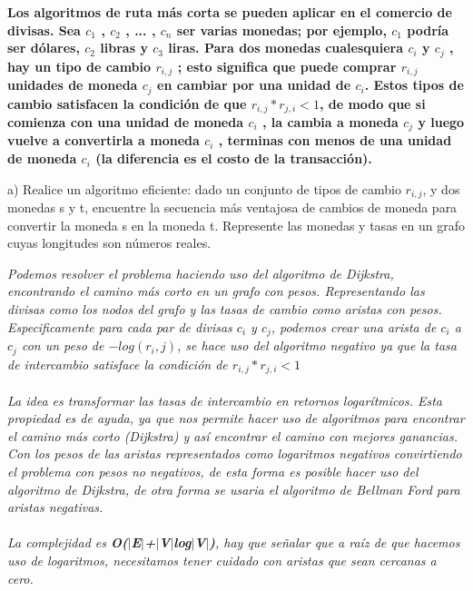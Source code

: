 \documentclass{article}
\begin{document}
\begin{question}
  \textbf{Los algoritmos de ruta más corta se pueden aplicar en el comercio de divisas. Sea $c_{1}$ , $c_{2}$ , ... , $c_{n}$ ser varias monedas; por ejemplo, $c_{1}$ podría ser dólares, $c_{2}$ libras y $c_{3}$ liras. Para dos monedas cualesquiera $c_{i}$ y $c_{j}$ , hay un tipo de cambio $r_{i,j}$ ; esto significa que puede comprar $r_{i,j}$ unidades de moneda $c_{j}$ en cambiar por una unidad de $c_{i}$. Estos tipos de cambio satisfacen la condición de que $r_{i,j} * r_{j,i} < 1$, de modo que si comienza con una unidad de moneda $c_{i}$ , la cambia a moneda $c_{j}$ y luego vuelve a convertirla a moneda $c_{i}$ , terminas con menos de una unidad de moneda $c_{i}$ (la diferencia es el costo de la transacción).}

  a) Realice un algoritmo eficiente: dado un conjunto de tipos de cambio $r_{i,j}$, y dos monedas s y t, encuentre la secuencia más ventajosa de cambios de moneda para convertir la moneda s en la moneda t. Represente las monedas y tasas en un grafo cuyas longitudes son números reales.
  
\end{question}

\textit{Podemos resolver el problema haciendo uso del algoritmo de Dijkstra, encontrando el camino más corto en un grafo con pesos. Representando las divisas como los nodos del grafo y las tasas de cambio como aristas con pesos. Especificamente para cada par de divisas $c_{i}$ y $c_{j}$, podemos crear una arista de $c_{i}$ a $c_{j}$ con un peso de $-log(r_{i},j)$, se hace uso del algoritmo negativo ya que la tasa de intercambio satisface la condición de $r_{i,j}*r_{j,i} < 1$\\\\ La idea es transformar las tasas de intercambio en retornos logarítmicos. Esta propiedad es de ayuda, ya que nos permite hacer uso de algoritmos para encontrar el camino más corto (Dijkstra) y así encontrar el camino con mejores ganancias. \\ Con los pesos de las aristas representados como logaritmos negativos convirtiendo el problema con pesos no negativos, de esta forma es posible hacer uso del algoritmo de Dijkstra, de otra forma se usaria el algoritmo de Bellman Ford para aristas negativas.\\\\ La complejidad es \textbf{O($|$E$|$+$|$V$|$log$|$V$|$)}, hay que señalar que a raíz de que hacemos uso de logaritmos, necesitamos tener cuidado con aristas que sean cercanas a cero.}
\end{document}
